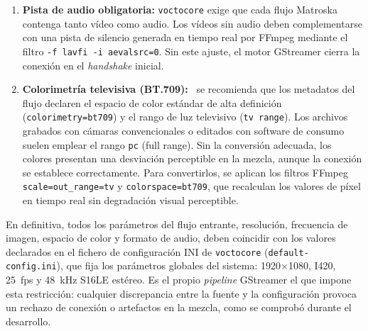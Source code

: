 \begin{enumerate}
  \item \textbf{Pista de audio obligatoria:} \texttt{voctocore} exige que cada flujo Matroska
        contenga tanto vídeo como audio. Los vídeos sin audio deben complementarse con
        una pista de silencio generada en tiempo real por FFmpeg mediante el filtro
        \texttt{-f lavfi -i aevalsrc=0}. Sin este ajuste, el motor GStreamer cierra la
        conexión en el \textit{handshake} inicial.
  \item \textbf{Colorimetría televisiva (BT.709):}~\cite{itu_bt709} se recomienda que los metadatos del
        flujo declaren el espacio de color estándar de alta definición
        (\texttt{colorimetry=bt709}) y el rango de luz televisivo (\texttt{tv range}).
        Los archivos grabados con cámaras convencionales o editados con software de
        consumo suelen emplear el rango \texttt{pc} (full range). Sin la conversión
        adecuada, los colores presentan una desviación perceptible en la mezcla, aunque
        la conexión se establece correctamente. Para convertirlos, se aplican los
        filtros FFmpeg \texttt{scale=out\_range=tv} y \texttt{colorspace=bt709}, que
        recalculan los valores de píxel en tiempo real sin degradación visual perceptible.
\end{enumerate}

En definitiva, todos los parámetros del flujo entrante, resolución, frecuencia de imagen,
espacio de color y formato de audio, deben coincidir con los valores declarados en el
fichero de configuración INI de \texttt{voctocore} (\texttt{default-config.ini}), que fija los
parámetros globales del sistema: 1920$\times$1080, I420, 25~fps y 48~kHz S16LE estéreo.
Es el propio \textit{pipeline} GStreamer el que impone esta restricción: cualquier discrepancia
entre la fuente y la configuración provoca un rechazo de conexión o artefactos en la
mezcla, como se comprobó durante el desarrollo.

